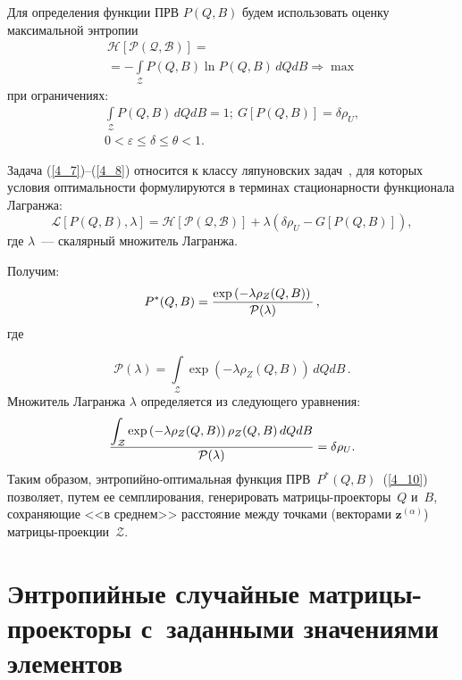\begin{multicols}{2}
Для определения функции ПРВ $P(Q,B)$ будем использовать оценку максимальной 
энтропии~\cite{Popkov_2020_dan}
\begin{multline}
\label{4_7}
\mathcal{H[P(Q,B)]} ={}\\
{}= - \int\limits_{\mathcal{Z}} P(Q,B) \ln P(Q,B)\, dQ dB 
\Rightarrow \max
\end{multline}
при ограничениях:
\begin{multline}
\displaystyle \int\limits_{\mathcal{Z}} P(Q,B)\,dQ dB = 1;\ G[P(Q,B)] = \delta \rho_U,\\
0 < \varepsilon \le \delta \le \theta < 1.
\label{4_8}
\end{multline}

Задача (\ref{4_7})--(\ref{4_8}) относится к классу ляпуновских 
задач~\cite{Joffe_1974}, для которых условия оптимальности формулируются в 
терминах стационарности функционала Лагранжа:
\begin{equation*}
\mathcal{L}[P(Q,B), \lambda] = \mathcal{H[P(Q,B)]} + \lambda \left(\delta 
\rho_U - G[P(Q,B)]\right),
\end{equation*}
где $\lambda$~--- скалярный множитель Лагранжа.

Получим:
\begin{equation}
\label{4_10}
P^*(Q,B) = 
\displaystyle\frac{\displaystyle \exp\left(- \lambda \rho_Z(Q,B) \right)\mathstrut}{\displaystyle \mathcal{P}(\lambda)\mathstrut}\,,
\end{equation}
где

\noindent

\begin{equation*}
\mathcal{P}(\lambda) = \int\limits_{\mathcal{Z}} \exp\left(- \lambda 
\rho_Z(Q,B)\right)\,dQ dB\,.
\end{equation*}
Множитель Лагранжа $\lambda$ определяется из следующего уравнения:
\begin{equation*}
\displaystyle\frac{\displaystyle \int\nolimits_{\mathcal{Z}} \exp\left(- \lambda \rho_Z(Q,B) \right) 
\rho_Z(Q,B)\, dQ dB\mathstrut}{\displaystyle \mathcal{P}(\lambda)\mathstrut} = \delta \rho_U.
\end{equation*}
Таким образом, энтропийно-оптимальная функция ПРВ~$P^*(Q,B)$~(\ref{4_10}) 
позволяет, путем ее семплирования, генерировать 
мат\-ри\-цы-про\-ек\-то\-ры~$Q$ и~$B$, сохраняющие <<в среднем>> расстояние 
между точками (векторами $\mathbf{z}^{(\alpha)}$) 
мат\-ри\-цы-про\-ек\-ции~$\mathcal{Z}$.

\section{Энтропийные случайные матрицы-проекторы с~заданными значениями 
элементов}


\end{multicols}
